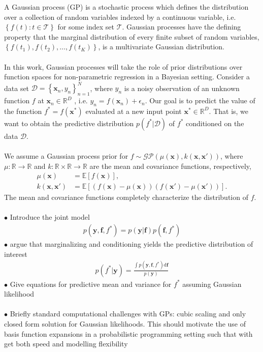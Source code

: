 \documentclass[]{interact}
\theoremstyle{plain}%
\theoremstyle{definition}
\theoremstyle{remark}
\begin{document}
A Gaussian process (GP) is a stochastic process which defines the distribution over a collection of random variables indexed by a continuous variable, i.e. $\left\lbrace f(t): t \in \mathcal{T}\right\rbrace$ for some index set $\mathcal{T}$. Gaussian processes have the defining property that the marginal distribution of every finite subset of random variables, $\left\lbrace f(t_1), f(t_2), \hdots, f(t_K) \right\rbrace$, is a multivariate Gaussian distribution.
\\
\\
In this work, Gaussian processes will take the role of prior distributions over function spaces for non-parametric regression in a Bayesian setting. 
Consider a data set $\mathcal{D} = \left\lbrace \mathbf{x}_n, y_n \right\rbrace_{n=1}^N$, where $y_n$ is a noisy observation of an unknown function $f$ at $\mathbf{x}_n \in \mathbb{R}^D$ , i.e. $y_n = f(\mathbf{x}_n) + \epsilon_n$. Our goal is to predict the value of the function $f^*=f(\mathbf{x}^*)$ evaluated at a new input point $\mathbf{x}^* \in \mathbb{R}^D$. That is, we want to obtain the predictive distribution $p(f^*|\mathcal{D})$ of $f^*$ conditioned on the data $\mathcal{D}$.
\\
\\
We assume a Gaussian process prior for $f \sim \mathcal{GP}(\mu(\mathbf{x}), k(\mathbf{x}, \mathbf{x}'))$, where $\mu: \mathbb{R} \rightarrow \mathbb{R}$ and $k: \mathbb{R} \times \mathbb{R} \rightarrow \mathbb{R}$ are the mean and covariance functions, respectively,
\begin{align}
 	\mu(\mathbf{x}) &= \mathbb{E}\!\left[f(\mathbf{x})\right],\\ 
 	k(\mathbf{x}, \mathbf{x}') &= \mathbb{E}\!\left[\left( f(\mathbf{x}) - \mu(\mathbf{x}) \right)\left( f(\mathbf{x}') - \mu(\mathbf{x}') \right)\right].
 \end{align} 
The mean and covariance functions completely characterize the distribution of $f$. 
\\
\\
{\color{red} $\bullet$ Introduce the joint model}
\begin{align}
	p(\mathbf{y}, \mathbf{f}, f^*) = p(\mathbf{y}|\mathbf{f})p(\mathbf{f}, f^*)
\end{align}
{\color{red} $\bullet$  argue that marginalizing and conditioning yields the predictive distribution of interest}
\begin{align}
	p(f^*|\mathbf{y}) = \frac{\int p(\mathbf{y}, \mathbf{f}, f^*)\text{d}\mathbf{f}}{p(\mathbf{y})}
\end{align}
{\color{red} $\bullet$ Give equations for predictive mean and variance for $f^*$ assuming Gaussian likelihood}
\\
\\
{\color{red} $\bullet$ Briefly standard computational challenges with GPs: cubic scaling and only closed form solution for Gaussian likelihoods. This should motivate the use of basis function expansions in a probabilistic programming setting such that with get both speed and modelling flexibility}
\\
\\
\end{document}
